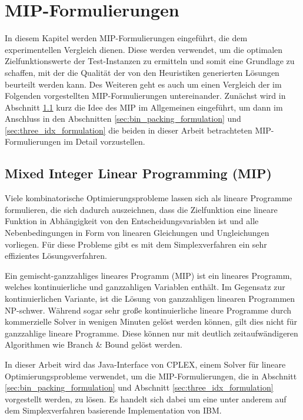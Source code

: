 \pagebreak

\section{MIP-Formulierungen}
\label{sec:mip_formulations}

In diesem Kapitel werden MIP-Formulierungen eingeführt, die dem experimentellen Vergleich dienen.
Diese werden verwendet, um die optimalen Zielfunktionswerte der Test-Instanzen zu ermitteln und somit eine Grundlage zu schaffen, mit der die Qualität der von den Heuristiken generierten Lösungen beurteilt werden kann. Des Weiteren geht es auch um einen Vergleich der im Folgenden vorgestellten MIP-Formulierungen untereinander. Zunächst wird in Abschnitt \ref{sec:mip_definition} kurz die Idee des MIP im Allgemeinen
eingeführt, um dann im Anschluss in den Abschnitten \ref{sec:bin_packing_formulation} und \ref{sec:three_idx_formulation} die beiden in dieser Arbeit betrachteten MIP-Formulierungen im Detail vorzustellen.

\subsection{Mixed Integer Linear Programming (MIP)}
\label{sec:mip_definition}

Viele kombinatorische Optimierungsprobleme lassen sich als lineare Programme formulieren, die sich dadurch
auszeichnen, dass die Zielfunktion eine lineare Funktion in Abhängigkeit von den Entscheidungsvariablen ist
und alle Nebenbedingungen in Form von linearen Gleichungen und Ungleichungen vorliegen. Für diese Probleme gibt es mit dem Simplexverfahren ein sehr effizientes Lösungsverfahren.\cite{Knust2017}

Ein gemischt-ganzzahliges lineares Programm (MIP) ist ein lineares Programm, welches kontinuierliche und ganzzahligen Variablen
enthält. Im Gegensatz zur kontinuierlichen Variante, ist die Lösung von ganzzahligen linearen Programmen NP-schwer.
Während sogar sehr große kontinuierliche lineare Programme durch kommerzielle Solver in wenigen Minuten gelöst werden können, gilt dies nicht für ganzzahlige lineare Programme. Diese können nur mit deutlich zeitaufwändigeren Algorithmen wie Branch \& Bound gelöst werden.\cite{Brucker2006}

In dieser Arbeit wird das Java-Interface von CPLEX, einem Solver für lineare Optimierungsprobleme verwendet,
um die MIP-Formulierungen, die in Abschnitt \ref{sec:bin_packing_formulation} und Abschnitt \ref{sec:three_idx_formulation} vorgestellt werden,
zu lösen. Es handelt sich dabei um eine unter anderem auf dem Simplexverfahren basierende Implementation von IBM. \cite{CPLEX2015}

